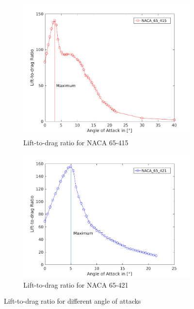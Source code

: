 \documentclass[10pt]{article}
\begin{document}
\begin{figure}[htb!]
\begin{subfigure}{0.5\textwidth}
  \centering
  \includegraphics[width=1\linewidth]{../CIP_1/lift_to_drag_ratio_415.png}
  \caption{Lift-to-drag ratio for NACA 65-415}
\end{subfigure}
\begin{subfigure}{0.5\textwidth}
  \centering
  \includegraphics[width=1\linewidth]{../CIP_1/lift_to_drag_ratio_421.png}
  \caption{Lift-to-drag ratio for NACA 65-421}
\end{subfigure}
\caption{Lift-to-drag ratio for different angle of attacks}
\label{fig:comparison_lift_to_drag}
\end{figure}
\end{document}
